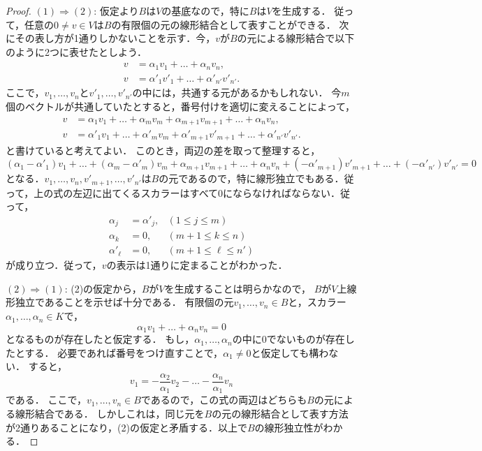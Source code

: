 \begin{proof}
    $(1) \Rightarrow (2)$:
    仮定より$B$は$V$の基底なので，特に$B$は$V$を生成する．
    従って，任意の$0 \neq v \in V$は$B$の有限個の元の線形結合として表すことができる．
    次にその表し方が1通りしかないことを示す．今，$v$が$B$の元による線形結合で以下のように2つに表せたとしよう．
    \[
        \begin{aligned}
            v &= \alpha_1 v_1 + \dots + \alpha_n v_n, \\
            v &= \alpha'_1 v'_1 + \dots + \alpha'_{n'} v'_{n'}.
        \end{aligned}
    \]
    ここで，$v_1,\dots,v_n$と$v'_1,\dots,v'_{n'}$の中には，共通する元があるかもしれない．
    今$m$個のベクトルが共通していたとすると，番号付けを適切に変えることによって，
    \[
        \begin{aligned}
            v &= \alpha_1 v_1 + \dots + \alpha_m v_m + \alpha_{m+1} v_{m+1} + \dots + \alpha_n v_n, \\
            v &= \alpha'_1 v_1 + \dots + \alpha'_m v_m + \alpha'_{m+1} v'_{m+1} + \dots + \alpha'_{n'} v'_{n'}.
        \end{aligned}
    \]
    と書けていると考えてよい．
    このとき，両辺の差を取って整理すると，
    \[
        (\alpha_1-\alpha'_1) v_1 + \dots + (\alpha_m - \alpha'_m) v_m + \alpha_{m+1} v_{m+1} + \dots + \alpha_n v_n  + (-\alpha'_{m+1}) v'_{m+1} + \dots + (- \alpha'_{n'}) v'_{n'} = 0
    \]
    となる．$v_1,\dots,v_n,v'_{m+1},\dots,v'_{n'}$は$B$の元であるので，特に線形独立でもある．従って，上の式の左辺に出てくるスカラーはすべて0にならなければならない．従って，
    \[
        \begin{aligned}
            \alpha_j &= \alpha'_j, &(1 \le j \le m) \\
            \alpha_k &= 0, &(m+1 \le k \le n) \\
            \alpha'_{\ell} &= 0, &(m+1 \le \ell \le n')
        \end{aligned}
    \]
    が成り立つ．従って，$v$の表示は1通りに定まることがわかった．
    
    $(2) \Rightarrow (1)$: (2)の仮定から，$B$が$V$を生成することは明らかなので，
    $B$が$V$上線形独立であることを示せば十分である．
    有限個の元$v_1,\dots,v_n \in B$と，スカラー$\alpha_1,\dots,\alpha_n \in K$で，
    \[
        \alpha_1 v_1 + \dots + \alpha_n v_n = 0
    \]
    となるものが存在したと仮定する．
    もし，$\alpha_1,\dots,\alpha_n$の中に0でないものが存在したとする．
    必要であれば番号をつけ直すことで，$\alpha_1 \neq 0$と仮定しても構わない．
    すると，
    \[
        v_1 = -\frac{\alpha_2}{\alpha_1} v_2 - \dots - \frac{\alpha_n}{\alpha_1} v_n
    \]
    である．
    ここで，$v_1,\dots,v_n \in B$であるので，この式の両辺はどちらも$B$の元による線形結合である．
    しかしこれは，同じ元を$B$の元の線形結合として表す方法が2通りあることになり，(2)の仮定と矛盾する．以上で$B$の線形独立性がわかる．
    

\end{proof}
